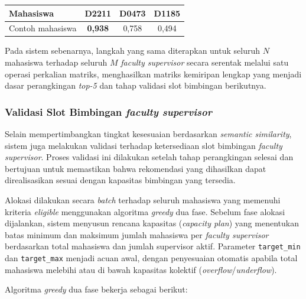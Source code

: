 \begin{center}
\begin{tabular}{|p{3.2cm}|c|c|c|}
\hline
\textbf{Mahasiswa} & \textbf{D2211} & \textbf{D0473} & \textbf{D1185} \\ \hline
Contoh mahasiswa & \textbf{0,938} & 0,758 & 0,494 \\ \hline
\end{tabular}
\label{table:ilustrasi_matriks_similaritas}
\end{center}

\noindent Pada sistem sebenarnya, langkah yang sama diterapkan untuk seluruh $N$ mahasiswa terhadap seluruh $M$ \textit{faculty supervisor} secara serentak melalui satu operasi perkalian matriks, menghasilkan matriks kemiripan lengkap yang menjadi dasar perangkingan \textit{top-5} dan tahap validasi slot bimbingan berikutnya.

\subsubsection{Validasi Slot Bimbingan \textit{faculty supervisor}}\label{validasi-slot-bimbingan-faculty-supervisor}

Selain mempertimbangkan tingkat kesesuaian berdasarkan \textit{semantic similarity}, sistem juga melakukan validasi terhadap ketersediaan slot bimbingan \textit{faculty supervisor}. Proses validasi ini dilakukan setelah tahap perangkingan selesai dan bertujuan untuk memastikan bahwa rekomendasi yang dihasilkan dapat direalisasikan sesuai dengan kapasitas bimbingan yang tersedia.

Alokasi dilakukan secara \textit{batch} terhadap seluruh mahasiswa yang memenuhi kriteria \textit{eligible} menggunakan algoritma \textit{greedy} dua fase. Sebelum fase alokasi dijalankan, sistem menyusun rencana kapasitas (\textit{capacity plan}) yang menentukan batas minimum dan maksimum jumlah mahasiswa per \textit{faculty supervisor} berdasarkan total mahasiswa dan jumlah supervisor aktif. Parameter \texttt{target\_min} dan \texttt{target\_max} menjadi acuan awal, dengan penyesuaian otomatis apabila total mahasiswa melebihi atau di bawah kapasitas kolektif (\textit{overflow}/\textit{underflow}).

Algoritma \textit{greedy} dua fase bekerja sebagai berikut:

